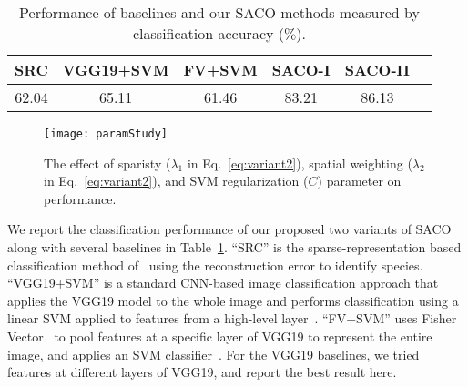 \documentclass[10pt,twocolumn,letterpaper]{article}
\begin{document}
\begin{table}[t]
\small
  \centering
  \begin{tabular}{ | c| c| c | c|  c|  c| }
     \hline
        SRC & VGG19+SVM & FV+SVM & SACO-I & SACO-II \\
     \hline
     62.04 & 65.11 & 61.46 & 83.21 & 86.13 \\
     \hline
   \end{tabular}
\caption{Performance of baselines and our SACO methods measured by classification accuracy ($\%$).}
\label{tab:twoVariants}
\vspace{-3mm}
\end{table}



\begin{figure*}[ht!]
\centering
   \texttt{[image: paramStudy]}
\vspace{-1mm}
   \caption{The effect of sparisty
   ($\lambda_1$ in Eq.~\ref{eq:variant2}),
   spatial weighting ($\lambda_2$ in Eq.~\ref{eq:variant2}),
   and SVM regularization ($C$) parameter on performance.  }
\label{fig:paramStudy}
\vspace{-3mm}
\end{figure*}

We report the classification performance of our proposed two variants of SACO
along with several baselines in Table~\ref{tab:twoVariants}.  ``SRC'' is the
sparse-representation based classification method of~\cite{wright2009robust}
using the reconstruction error to identify species.  ``VGG19+SVM'' is a
standard CNN-based image classification approach that applies the VGG19 model
to the whole image and performs classification using a linear SVM applied to
features from a high-level layer~\cite{donahue2013decaf}.  ``FV+SVM'' uses
Fisher Vector~\cite{perronnin2010improving} to pool features at a specific
layer of VGG19 to represent the entire image, and applies an SVM
classifier~\cite{cimpoi2015deep}.  For the VGG19 baselines, we tried features
at different layers of VGG19, and report the best result here.
\end{document}

